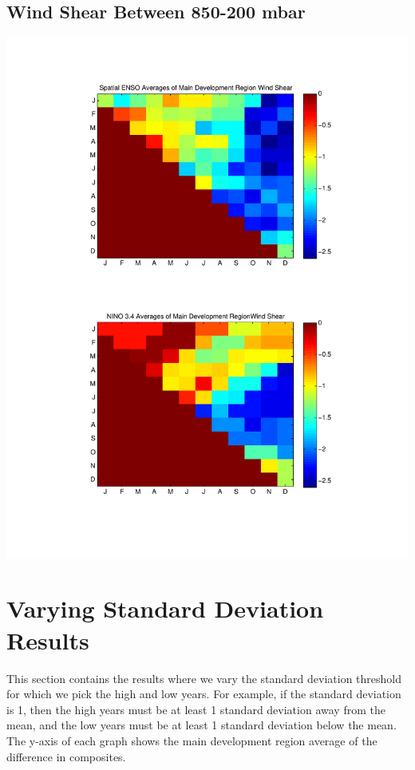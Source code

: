\documentclass[11pt]{article}
\begin{document}
\subsection{Wind Shear Between 850-200 mbar}
\includegraphics[scale=0.7]{images/varyingMonthsForMDRAveragesWindShear.pdf}

\section{Varying Standard Deviation Results}
This section contains the results where we vary the standard deviation threshold for which we pick the high and low years.  For example, if the standard deviation is 1, then the high years must be at least 1 standard deviation away from the mean, and the low years must be at least 1 standard deviation below the mean.  The y-axis of each graph shows the main development region average of the difference in composites.
\end{document}
